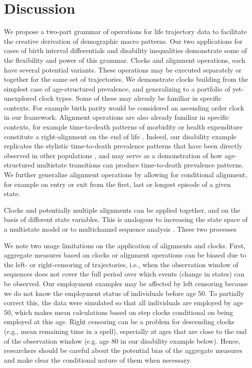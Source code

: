 \documentclass[a4paper,left=1.25cm,right=1.25cm,top=1.25cm,bottom=1.25cm]{article}
\begin{document}
\section{Discussion}

We propose a two-part grammar of operations for life trajectory data to facilitate the creative derivation of demographic macro patterns. Our two applications for cases of birth interval differentials and disability inequalities demonstrate some of the flexibility and power of this grammar. Clocks and alignment operations, each have several potential variants. These operations may be executed separately or together for the same set of trajectories. We demonstrate clocks building from the simplest case of age-structured prevalence, and generalizing to a portfolio of yet-unexplored clock types. Some of these may already be familiar in specific contexts. For example birth parity would be considered an ascending order clock in our framework. Alignment operations are also already familiar in specific contexts, for example time-to-death patterns of morbidity or health expenditure constitute a right-alignment on the end of life \citep{riffe2017unified, raab2018pathways, potente2018disability}. Indeed, our disability example replicates the stylistic time-to-death prevalence patterns that have been directly observed in other populations \citep{klijs2010disability, riffe2016time}, and may serve as a demonstration of how age-structured multistate transitions can produce time-to-death prevalence patterns. We further generalize alignment operations by allowing for conditional alignment, for example on entry or exit from the first, last or longest episode of a given state.

Clocks and potentially multiple alignments can be applied together, and on the basis of different state variables. This is analogous to increasing the state space of a multistate model or to multichannel sequence analysis \citep{robette2015global, gauthier2010multichannel}. These two processes 

We note two usage limitations on the application of alignments and clocks. First, aggregate measures based on clocks or alignment operations can be biased due to the left- or right-censoring of trajectories, i.e., when the observation window of sequences does not cover the full period over which events (change in states) can be observed. Our employment examples may be affected by left censoring because we do not know the employment status of individuals before age 50. To partially correct this, the data were simulated so that all individuals are employed by age 50, which makes mean calculations based on step clocks conditional on being employed at this age. Right censoring can be a problem for descending clocks (e.g., mean remaining time in a spell), especially at ages that are close to the end of the observation window (e.g. age 80 in our disability example below). Hence, researchers should be careful about the potential bias of the aggregate measures and make clear the conditional nature of them when necessary.
\end{document}
